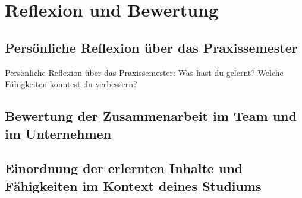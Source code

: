 \chapter{Reflexion und Bewertung}


\section{Persönliche Reflexion über das Praxissemester}

Persönliche Reflexion über das Praxissemester: Was hast du gelernt? Welche Fähigkeiten konntest du verbessern?

\section{Bewertung der Zusammenarbeit im Team und im Unternehmen}

\section{Einordnung der erlernten Inhalte und Fähigkeiten im Kontext deines Studiums}
